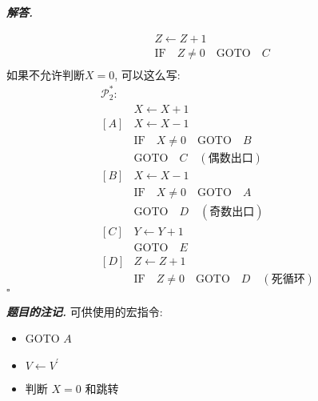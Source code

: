 \documentclass[10pt, a4paper, oneside]{ctexart}
\newenvironment{solution}{%
  \par\noindent\textbf{\textit{解答. }}\ignorespaces
}{%
  \hfill\ensuremath{\square}\par
}
\newenvironment{note}{\par\noindent\textbf{\textit{题目的注记. }}\ignorespaces}{\par}
\begin{document}
\begin{solution}
\begin{align*}
            [C]&Z\leftarrow Z+1\\
            &\text{IF}\quad Z\neq 0 \quad \text{GOTO}\quad  C\\
        \end{align*} 
        如果不允许判断$X=0$, 可以这么写:
        \begin{align*}
            \mathscr{P}_2^*:&\\
            &X\leftarrow X+1\\
            [A]&X\leftarrow X-1\\
            &\text{IF}\quad X\neq 0 \quad \text{GOTO}\quad  B\\
            &\text{GOTO} \quad C\quad(\text{偶数出口})\\
            [B]&X\leftarrow X-1\\
            &\text{IF}\quad X\neq 0 \quad \text{GOTO}\quad  A\\
            &\text{GOTO} \quad D\quad(\text{奇数出口})\\
            [C]&Y\leftarrow Y+1\\
            &\text{GOTO}\quad E\\
            [D]&Z\leftarrow Z+1\\
            &\text{IF}\quad Z\neq 0 \quad \text{GOTO}\quad  D\quad(\text{死循环})
        \end{align*} 
    \end{solution}
    
    \begin{note}
    可供使用的宏指令:\begin{itemize}
        \item GOTO $A$
        \item $V\leftarrow V^{\prime}$ 
        \item 判断 $X=0$ 和跳转
    \end{itemize}
    \end{note}
    
\end{document}
